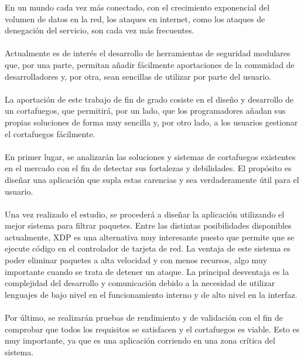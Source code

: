 En un mundo cada vez más conectado, con el crecimiento exponencial del volumen de datos en la red, los ataques en internet, como los ataques de denegación del servicio, son cada vez más frecuentes.
\\\\Actualmente es de interés el desarrollo de herramientas de seguridad modulares que, por una parte, permitan añadir fácilmente aportaciones de la comunidad de desarrolladores y, por otra, sean sencillas de utilizar por parte del usuario.
\\\\La aportación de este trabajo de fin de grado cosiste en el diseño y desarrollo de un cortafuegos, que permitirá, por un lado, que los programadores añadan sus propias soluciones de forma muy sencilla y, por otro lado,  a los usuarios gestionar el cortafuegos fácilmente.
\\\\En primer lugar, se analizarán las soluciones y sistemas de cortafuegos existentes en el mercado con el fin de detectar sus fortalezas y debilidades. El propósito es diseñar una aplicación que supla estas carencias y sea verdaderamente útil para el usuario.
\\\\Una vez realizado el estudio, se procederá a diseñar la aplicación utilizando el mejor sistema para filtrar paquetes. Entre las distintas posibilidades disponibles actualmente, XDP es una alternativa muy interesante puesto que permite que se ejecute código en el controlador de tarjeta de red. La ventaja de este sistema es poder eliminar paquetes a alta velocidad y con menos recursos, algo muy importante cuando se trata de detener un ataque. La principal desventaja es la complejidad del desarrollo y comunicación debido a la necesidad de utilizar lenguajes de bajo nivel en el funcionamiento interno y de alto nivel en la interfaz.
\\\\Por último, se realizarán pruebas de rendimiento y de validación con el fin de comprobar que todos los requisitos se satisfacen y el cortafuegos es viable. Esto es muy importante, ya que es una aplicación corriendo en una zona crítica del sistema.

